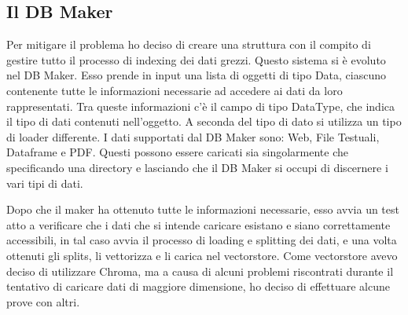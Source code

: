 \subsection{Il DB Maker}
\label{sec:dbmaker}
Per mitigare il problema ho deciso di creare una struttura con il compito di gestire tutto il processo di indexing dei dati grezzi. Questo sistema si è evoluto nel DB Maker. Esso prende in input una lista di oggetti di tipo Data, ciascuno contenente tutte le informazioni necessarie ad accedere ai dati da loro rappresentati. Tra queste informazioni c'è il campo di tipo DataType, che indica il tipo di dati contenuti nell'oggetto. A seconda del tipo di dato si utilizza un tipo di loader differente. I dati supportati dal DB Maker sono: Web, File Testuali, Dataframe e PDF. Questi possono essere caricati sia singolarmente che specificando una directory e lasciando che il DB Maker si occupi di discernere i vari tipi di dati.

Dopo che il maker ha ottenuto tutte le informazioni necessarie, esso avvia un test atto a verificare che i dati che si intende caricare esistano e siano correttamente accessibili, in tal caso avvia il processo di loading e splitting dei dati, e una volta ottenuti gli splits, li vettorizza e li carica nel vectorstore. Come vectorstore avevo deciso di utilizzare Chroma, ma a causa di alcuni problemi riscontrati durante il tentativo di caricare dati di maggiore dimensione, ho deciso di effettuare alcune prove con altri.

